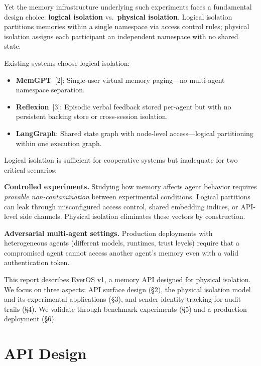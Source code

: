 \documentclass[11pt, a4paper]{article}
\begin{document}
Yet the memory infrastructure underlying such experiments faces a fundamental design choice: \textbf{logical isolation} vs.\ \textbf{physical isolation}. Logical isolation partitions memories within a single namespace via access control rules; physical isolation assigns each participant an independent namespace with no shared state.

Existing systems choose logical isolation:
\begin{itemize}[nosep]
  \item \textbf{MemGPT}~[2]: Single-user virtual memory paging---no multi-agent namespace separation.
  \item \textbf{Reflexion}~[3]: Episodic verbal feedback stored per-agent but with no persistent backing store or cross-session isolation.
  \item \textbf{LangGraph}: Shared state graph with node-level access---logical partitioning within one execution graph.
\end{itemize}

Logical isolation is sufficient for cooperative systems but inadequate for two critical scenarios:

\textbf{Controlled experiments.} Studying how memory affects agent behavior requires \emph{provable non-contamination} between experimental conditions. Logical partitions can leak through misconfigured access control, shared embedding indices, or API-level side channels. Physical isolation eliminates these vectors by construction.

\textbf{Adversarial multi-agent settings.} Production deployments with heterogeneous agents (different models, runtimes, trust levels) require that a compromised agent cannot access another agent's memory even with a valid authentication token.

This report describes EverOS v1, a memory API designed for physical isolation. We focus on three aspects: API surface design (\S2), the physical isolation model and its experimental applications (\S3), and sender identity tracking for audit trails (\S4). We validate through benchmark experiments (\S5) and a production deployment (\S6).

\section{API Design}
\end{document}
